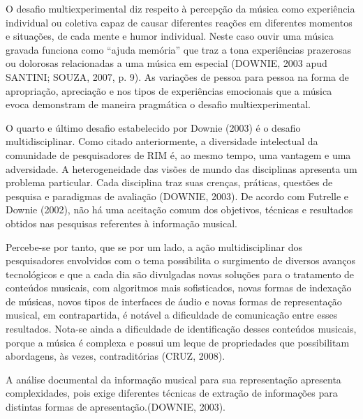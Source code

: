 O desafio multiexperimental diz respeito à percepção da música como experiência individual ou coletiva capaz de causar diferentes reações em diferentes momentos e situações, de cada mente e humor individual. Neste caso ouvir uma música gravada funciona como “ajuda memória” que traz a tona experiências prazerosas ou dolorosas relacionadas a uma música em especial (DOWNIE, 2003 apud SANTINI; SOUZA, 2007, p. 9). As variações de pessoa para pessoa na forma de apropriação, apreciação e nos tipos de experiências emocionais que a música evoca demonstram de maneira pragmática o desafio multiexperimental.

O quarto e último desafio estabelecido por Downie (2003) é o desafio multidisciplinar. Como citado anteriormente, a diversidade intelectual da comunidade de pesquisadores de RIM é, ao mesmo tempo, uma vantagem e uma adversidade. A heterogeneidade das visões de mundo das disciplinas apresenta um problema particular. Cada disciplina traz suas crenças, práticas, questões de pesquisa e paradigmas de avaliação (DOWNIE, 2003). De acordo com Futrelle e Downie (2002), não há uma aceitação comum dos objetivos, técnicas e resultados obtidos nas pesquisas referentes à informação musical.

Percebe-se por tanto, que se por um lado, a ação multidisciplinar dos pesquisadores envolvidos com o tema possibilita o surgimento de diversos avanços tecnológicos e que a cada dia são divulgadas novas soluções para o tratamento de conteúdos musicais, com algoritmos mais sofisticados, novas formas de indexação de músicas, novos tipos de interfaces de áudio e novas formas de representação musical, em contrapartida, é notável a dificuldade de comunicação entre esses resultados. Nota-se ainda a dificuldade de identificação desses conteúdos musicais, porque a música é complexa e possui um leque de propriedades que possibilitam abordagens, às vezes, contraditórias (CRUZ, 2008).

A análise documental da informação musical para sua representação apresenta complexidades, pois exige diferentes técnicas de extração de informações para distintas formas de apresentação.(DOWNIE, 2003).